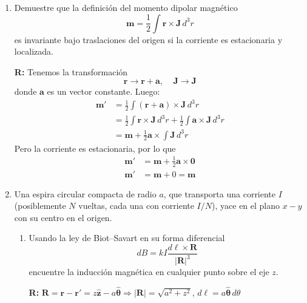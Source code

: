 \documentclass[]{article}
\numberwithin{equation}{section}
\newcommand{\0}{\textcolor{gray}{0}}
\newcommand{\rv}{\mathbf{r}}
\newcommand{\zv}{\mathbf{z}}
\newcommand{\zhat}{\hat{\zv}}
\newcommand{\that}{\hat{\mathbf{\theta}}}
\newcommand{\n}[1]{\mathbf{#1}}
\begin{document}
\begin{enumerate}
	\item Demuestre que la definición del momento dipolar magnético
	\begin{equation*}
		\n{m} = \frac{1}{2}\int \n{r} \times \n{J} \, d^3 r
	\end{equation*}
	es invariante bajo traslaciones del origen si la corriente es estacionaria y localizada.
	
	\textbf{R:} Tenemos la transformación
	\begin{equation*}
		\n{r} \rightarrow \n{r} + \n{a}, ~~~~~ \n{J} \rightarrow \n{J}
	\end{equation*}
	donde \(\n{a}\) es un vector constante. Luego:
	\begin{align*}
		\n{m}' &= \frac{1}{2}\int (\n{r} + \n{a}) \times \n{J} \, d^3 r\\
		&=  \frac{1}{2}\int \n{r} \times \n{J} \, d^3 r +  \frac{1}{2}\int \n{a} \times \n{J} \, d^3 r\\
		&= \n{m} + \frac{1}{2}\n{a}\times\int \n{J} \, d^3 r
	\end{align*}
	Pero la corriente es estacionaria, por lo que
	\begin{align*}
		\n{m}' &= \n{m} + \frac{1}{2}\n{a}\times\n{0}\\
		\n{m}' &= \n{m} + 0 = \n{m}
	\end{align*}
	
	\item Una espira circular compacta de radio \(a\), que transporta una corriente \(I\) (posiblemente \(N\) vueltas, cada una con corriente \(I/N\)), yace en el plano \(x-y\) con su centro en el origen.
	\begin{enumerate}
		\item Usando la ley de Biot–Savart en su forma diferencial
		\begin{equation*}
			dB = k I \frac{d\ell \times \n{R}}{|\n{R}|^3}
		\end{equation*}
		encuentre la inducción magnética en cualquier punto sobre el eje \(z\).
		
		\textbf{R:} \(\n{R} = \rv - \rv' = z\zhat - a\that \Rightarrow |\n{R}| = \sqrt{a^2 + z^2}\), \(d\ell = a \that\, d\theta\)
	\end{enumerate}
\end{enumerate}
\end{document}
